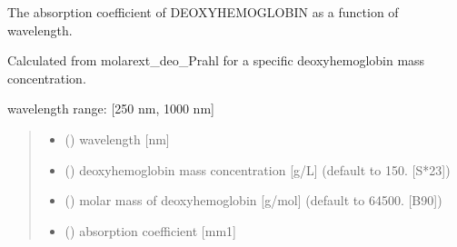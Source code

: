 \documentclass[letterpaper,10pt,english]{sphinxmanual}
\begin{document}
\begin{fulllineitems}
\label{\detokenize{03_absorption_coefficient:skinoptics.absorption_coefficient.mua_deo_Prahl}}
\pysigstartsignatures
{}
\pysigstopsignatures
\begin{DUlineblock}{0em}
\item[] The absorption coefficient of DEOXY\sphinxhyphen{}HEMOGLOBIN as a function of wavelength.
\item[] Calculated from molarext\_deo\_Prahl for a specific deoxy\sphinxhyphen{}hemoglobin mass concentration.
\end{DUlineblock}

\begin{DUlineblock}{0em}
\item[] wavelength range: {[}250 nm, 1000 nm{]}
\end{DUlineblock}
\begin{quote}\begin{description}
\begin{itemize}
\item {} 
\sphinxAtStartPar
{} () \textendash{} wavelength {[}nm{]}

\item {} 
\sphinxAtStartPar
{} () \textendash{} deoxy\sphinxhyphen{}hemoglobin mass concentration {[}g/L{]} (default to 150. {[}S*23{]})

\item {} 
\sphinxAtStartPar
{} () \textendash{} molar mass of deoxy\sphinxhyphen{}hemoglobin {[}g/mol{]} (default to 64500. {[}B90{]})

\end{itemize}

\sphinxAtStartPar
\begin{itemize}
\item {} 
\sphinxAtStartPar
{} () \textendash{} absorption coefficient {[}mm\sphinxhyphen{}1{]}

\end{itemize}


\end{description}\end{quote}

\end{fulllineitems}
\end{document}
